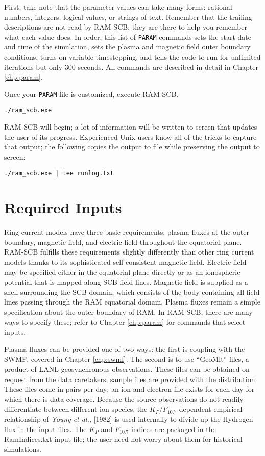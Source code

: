 First, take note that the parameter values can take many forms: rational numbers, integers, logical values, or strings of text. Remember that the trailing descriptions are not read by RAM-SCB; they are there to help you remember what each value does. In order, this list of {\tt PARAM} commands sets the start date and time of the simulation, sets the plasma and magnetic field outer boundary conditions, turns on variable timestepping, and tells the code to run for unlimited iterations but only 300 seconds. All commands are described in detail in Chapter \ref{chp:param}.

Once your {\tt PARAM} file is customized, execute RAM-SCB.

\begin{verbatim}
./ram_scb.exe
\end{verbatim}

RAM-SCB will begin; a lot of information will be written to screen that updates the user of its progress. Experienced Unix users know all of the tricks to capture that output; the following copies the output to file while preserving the output to screen:

\begin{verbatim}
./ram_scb.exe | tee runlog.txt
\end{verbatim}


\section{Required Inputs \label{subchap:input}}

Ring current models have three basic requirements: plasma fluxes at the outer boundary, magnetic field, and electric field throughout the equatorial plane. RAM-SCB fulfills these requirements slightly differently than other ring current models thanks to its sophisticated self-consistent magnetic field. Electric field may be specified either in the equatorial plane directly or as an ionospheric potential that is mapped along SCB field lines. Magnetic field is supplied as a shell surrounding the SCB domain, which consists of the body containing all field lines passing through the RAM equatorial domain. Plasma fluxes remain a simple specification about the outer boundary of RAM. In RAM-SCB, there are many ways to specify these; refer to Chapter \ref{chp:param} for commands that select inputs.

Plasma fluxes can be provided one of two ways: the first is coupling with the SWMF, covered in Chapter \ref{chp:swmf}. The second is to use ``GeoMlt'' files, a product of LANL geosynchronous observations. These files can be obtained on request from the data caretakers; sample files are provided with the distribution. These files come in pairs per day; an ion and electron file exists for each day for which there is data coverage. Because the source observations do not readily differentiate between different ion species, the $K_{P}$/$F_{10.7}$ dependent empirical relationship of \textit{Young et al.,} [1982] is used internally to divide up the Hydrogen flux in the input files. The $K_{P}$ and $F_{10.7}$ indices are packaged in the RamIndices.txt input file; the user need not worry about them for historical simulations.

